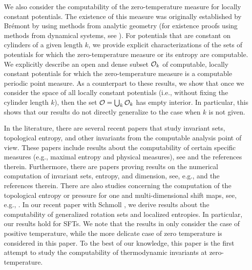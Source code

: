 \documentclass[11pt, reqno]{amsart}
\begin{document}
We also consider the computability of the zero-temperature measure for locally constant potentials. The existence of this measure was originally established by Br\'emont \cite{Br} by using methods from analytic geometry (for existence proofs using methods from dynamical systems, see \cite{CGU,L}).  For potentials that are constant on cylinders of a given length $k$, we provide explicit characterizations of the sets of potentials for which the zero-temperature measure or its entropy are computable.  We explicitly describe an open and dense subset $\mathcal O_k$ of computable, locally constant potentials for which the zero-temperature measure is a computable periodic point measure.
As a counterpart to these results, we show that once we consider the space of all locally constant potentials (i.e., without fixing the cylinder length $k$), then the set $\mathcal O=\bigcup_k \mathcal O_k$ has empty interior. In particular, this shows that our results do not directly generalize to the case when $k$ is not given.

In the literature, there are several recent papers that study invariant sets, topological entropy, and other invariants from the computable analysis point of view.  These papers include results about the computability of certain specific measures (e.g., maximal entropy and physical measures), see \cite{BBRY,GHR} and the references therein.  Furthermore, there are papers proving results on the numerical computation of invariant sets, entropy, and dimension, see, e.g., \cite{Co,JP1,JP2} and the references therein.  There are also studies concerning the computation of the topological entropy or pressure for one and multi-dimensional shift maps, see, e.g., \cite{ HS,HM,Pa, PS1,Sc,Sp}.  In our recent paper with Schmoll \cite{BSW}, we derive results about the computability of generalized rotation sets and localized entropies.  In particular, our results hold for SFTs.  We note that the results in \cite{BSW} only consider the case of positive temperature, while the 
more delicate case of zero temperature is considered in this paper.  To the best of our knowledge, this paper is the first attempt to study the  computability of thermodynamic invariants at zero-temperature. 
\end{document}
